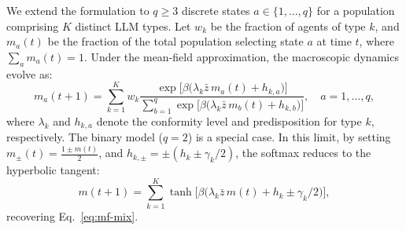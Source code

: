\documentclass{article}
\theoremstyle{plain}
\theoremstyle{definition}
\theoremstyle{remark}
\begin{document}
We extend the formulation to $q \ge 3$ discrete states $a \in \{1, \dots, q\}$ for a population comprising $K$ distinct LLM types.
Let $w_k$ be the fraction of agents of type $k$, and $m_a(t)$ be the fraction of the total population selecting state $a$ at time $t$,
where $\sum_a m_a(t) = 1$.
Under the mean-field approximation, the macroscopic dynamics evolve as:
\begin{equation}\label{eq:mf-potts-hetero}
m_a(t+1) = \sum_{k=1}^K w_k
\frac{\exp\bigl[\beta\bigl(\lambda_k \bar{z}\, m_a(t) + h_{k,a}\bigr)\bigr]}
{\sum_{b=1}^q \exp \bigl[\beta\bigl(\lambda_k \bar{z}\, m_b(t) + h_{k,b}\bigr)\bigr]}, \quad a=1,\dots,q,
\end{equation}
where $\lambda_k$ and $h_{k,a}$ denote the conformity level and predisposition for type $k$, respectively.
The binary model ($q=2$) is a special case. In this limit, by setting $m_{\pm}(t) = \frac{1 \pm m(t)}{2}$, and
$h_{k,\pm}=\pm(h_k\pm\gamma_k/2)$, the softmax reduces to the hyperbolic tangent:
\begin{equation}
m(t+1) = \sum_{k=1}^K \tanh\bigl[\beta\bigl(\lambda_k \bar{z}\, m(t) + h_k\pm\gamma_k/2\bigr)\bigr],
\end{equation}
recovering Eq.~\eqref{eq:mf-mix}.
\end{document}
